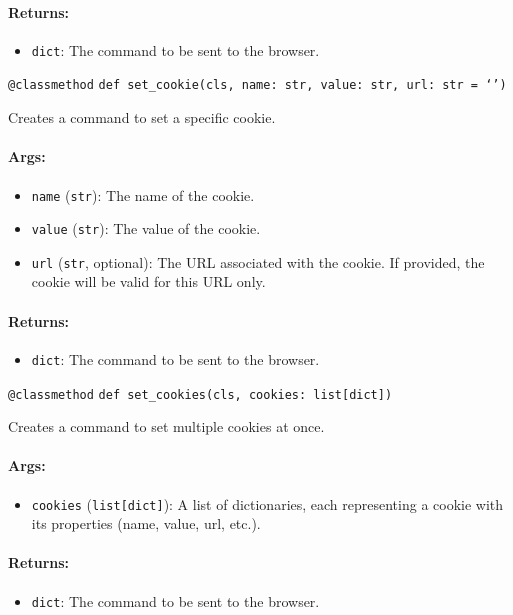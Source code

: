 \documentclass{article}
\begin{document}
\paragraph{Returns:}
\begin{itemize}
    \item \texttt{dict}: The command to be sent to the browser.
\end{itemize}

\noindent\texttt{@classmethod}
\noindent\texttt{def set\_cookie(cls, name: str, value: str, url: str = `')}

\noindent Creates a command to set a specific cookie.

\paragraph{Args:}
\begin{itemize}
    \item \texttt{name} (\texttt{str}): The name of the cookie.
    \item \texttt{value} (\texttt{str}): The value of the cookie.
    \item \texttt{url} (\texttt{str}, optional): The URL associated with the cookie. If provided, the cookie will be valid for this URL only.
\end{itemize}

\paragraph{Returns:}
\begin{itemize}
    \item \texttt{dict}: The command to be sent to the browser.
\end{itemize}

\noindent\texttt{@classmethod}
\noindent\texttt{def set\_cookies(cls, cookies: list[dict])}

\noindent Creates a command to set multiple cookies at once.

\paragraph{Args:}
\begin{itemize}
    \item \texttt{cookies} (\texttt{list[dict]}): A list of dictionaries, each representing a cookie with its properties (name, value, url, etc.).
\end{itemize}

\paragraph{Returns:}
\begin{itemize}
    \item \texttt{dict}: The command to be sent to the browser.
\end{itemize}
\end{document}
